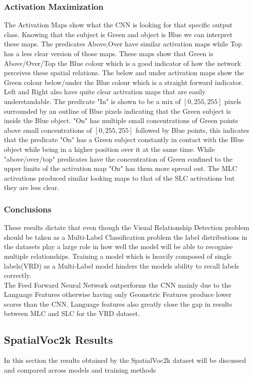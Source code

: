 \documentclass{csfyp}
\begin{document}
\subsubsection{Activation Maximization}
The Activation Maps show what the CNN is looking for that specific output class. Knowing that the subject is Green and object is Blue we can interpret these maps. The predicates Above,Over have similar activation maps while Top has a less clear version of those maps. These maps show that Green is Above/Over/Top the Blue colour which is a good indicator of how the network perceives these spatial relations. The below and under activation maps show the Green colour below/under the Blue colour which is a straight forward indicator. Left and Right also have quite clear activation maps that are easily understandable. The predicate "In" is shown to be a mix of $[0,255,255]$ pixels surrounded by an outline of Blue pixels indicating that the Green subject is inside the Blue object. "On" has multiple small concentrations  of Green points above small concentrations of $[0,255,255]$ followed by Blue points, this indicates that the predicate "On" has a Green subject constantly in contact with the Blue object while being in a higher position over it at the same time. While "above/over/top" predicates have the concentration of Green confined to the upper limits of the activation map "On" has them more spread out. The MLC activations produced similar looking maps to that of the SLC activations but they are less clear.


\subsubsection{Conclusions}
These results dictate that even though the Visual Relationship Detection problem should be taken as a Multi-Label Classification problem the label distributions in the datasets play a large role in how well the model will be able to recognise multiple relationships. Training a model which is heavily composed of single labels(VRD) as a Multi-Label model hinders the models ability to recall labels correctly.
\\
The Feed Forward Neural Network outperforms the CNN mainly due to the Language Features otherwise having only Geometric Features produce lower scores than the CNN. Language features also greatly close the gap in results between MLC and SLC for the VRD dataset. 

\subsection{SpatialVoc2k Results}
In this section the results obtained by the SpatialVoc2k dataset will be discussed and compared across models and training methods
\end{document}
